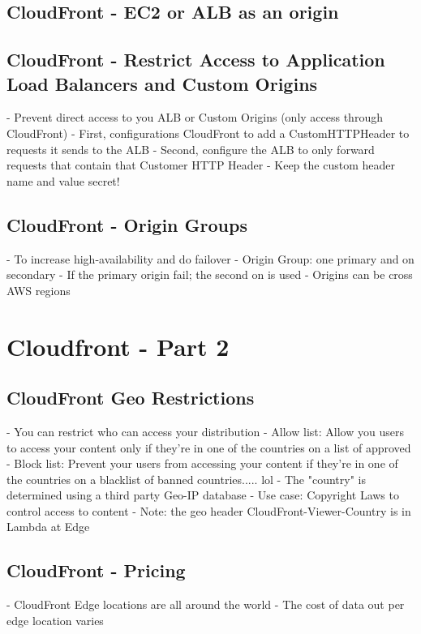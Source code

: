 \documentclass[11pt]{book}
\begin{document}

    \subsection{CloudFront - EC2 or ALB as an origin}

    \subsection{CloudFront - Restrict Access to Application Load Balancers and Custom Origins}
    - Prevent direct access to you ALB or Custom Origins (only access through CloudFront)
    - First, configurations CloudFront to add a CustomHTTPHeader to requests it sends to the ALB
    - Second, configure the ALB to only forward requests that contain that Customer HTTP Header
    - Keep the custom header name and value secret!


    \subsection{CloudFront - Origin Groups}
    - To increase high-availability and do failover
    - Origin Group: one primary and on secondary
    - If the primary origin fail; the second on is used
    - Origins can be cross AWS regions


    \section{Cloudfront - Part 2}

    \subsection{CloudFront Geo Restrictions}
    - You can restrict who can access your distribution
    - Allow list: Allow you users to access your content only if they're in one of the countries on a list of approved
    - Block list: Prevent your users from accessing your content if they're in one of the countries on a blacklist of banned countries..... lol
    - The "country" is determined using a third party Geo-IP database
    - Use case: Copyright Laws to control access to content
    - Note: the geo header CloudFront-Viewer-Country is in Lambda at Edge

    \subsection{CloudFront - Pricing}
    - CloudFront Edge locations are all around the world
    - The cost of data out per edge location varies
\end{document}
